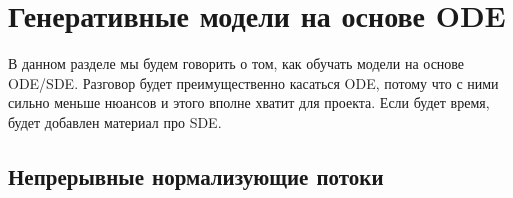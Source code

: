 \documentclass[12pt]{article}
\theoremstyle{definition}
\begin{document}
\section{Генеративные модели на основе ODE}
В данном разделе мы будем говорить о том, как обучать модели на основе ODE/SDE. Разговор будет преимущественно касаться ODE, потому что с ними сильно меньше нюансов и этого вполне хватит для проекта. Если будет время, будет добавлен материал про SDE. 

\subsection{Непрерывные нормализующие потоки}

\end{document}
